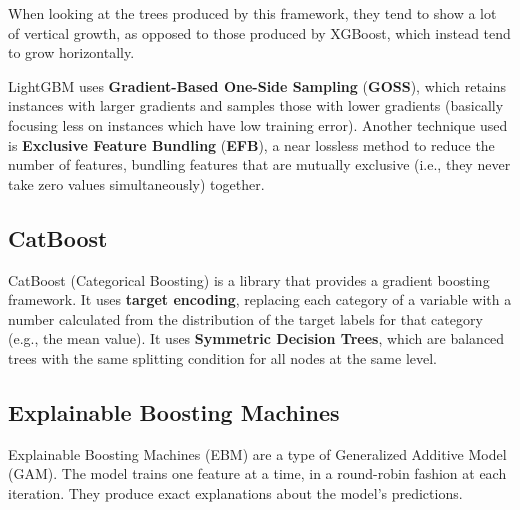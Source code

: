 When looking at the trees produced by this framework, they tend to show a lot of vertical growth, as opposed to those produced by XGBoost, which instead tend to grow horizontally.

LightGBM uses \textbf{Gradient-Based One-Side Sampling} (\textbf{GOSS}), which retains instances with larger gradients and samples those with lower gradients (basically focusing less on instances which have low training error). Another technique used is \textbf{Exclusive Feature Bundling} (\textbf{EFB}), a near lossless method to reduce the number of features, bundling features that are mutually exclusive (i.e., they never take zero values simultaneously) together.

\subsection{CatBoost}

CatBoost (Categorical Boosting) is a library that provides a gradient boosting framework. It uses \textbf{target encoding}, replacing each category of a variable with a number calculated from the distribution of the target labels for that category (e.g., the mean value). It uses \textbf{Symmetric Decision Trees}, which are balanced trees with the same splitting condition for all nodes at the same level.

\subsection{Explainable Boosting Machines}

Explainable Boosting Machines (EBM) are a type of Generalized Additive Model (GAM). The model trains one feature at a time, in a round-robin fashion at each iteration. They produce exact explanations about the model's predictions. 